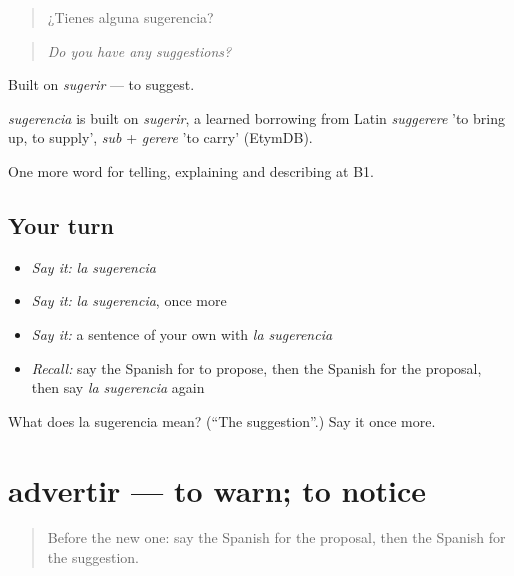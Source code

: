 \begin{quote}
¿Tienes alguna sugerencia?
\end{quote}

\begin{quote}
\emph{Do you have any suggestions?}
\end{quote}

Built on \emph{sugerir} — to suggest.

\begin{cousinweb}
\emph{sugerencia} is built on \emph{sugerir}, a learned borrowing from Latin \emph{suggerere} 'to bring up, to supply', \emph{sub} + \emph{gerere} 'to carry' (EtymDB).
\end{cousinweb}

\begin{grammarlens}[title={What you've built}]
One more word for telling, explaining and describing at B1.
\end{grammarlens}

\subsection*{Your turn}
\begin{itemize}
\raggedright
  \item \emph{Say it:} \emph{la sugerencia}
  \item \emph{Say it:} \emph{la sugerencia}, once more
  \item \emph{Say it:} a sentence of your own with \emph{la sugerencia}
  \item \emph{Recall:} say the Spanish for to propose, then the Spanish for the proposal, then say \emph{la sugerencia} again
\end{itemize}

\begin{tcolorbox}[breakable,colback=teal!4,colframe=teal!35!black,title={Before you move on}]
What does la sugerencia mean? (\textquotedblleft{}The suggestion\textquotedblright{}.) Say it once more.
\end{tcolorbox}
\section[advertir]{advertir — to warn; to notice}

\label{lesson:ES-C585-advertir}



\begin{quote}
Before the new one: say the Spanish for the proposal, then the Spanish for the suggestion.
\end{quote}

